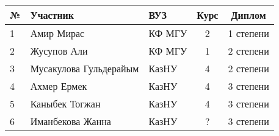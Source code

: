 \begin{center}
\begin{tabular}{|l|l|l|c|c|}
\hline
№ & Участник & ВУЗ & Курс & Диплом \\
\hline
1 & Амир Мирас & КФ МГУ & 2 & 1 степени \\
\hline
2 & Жусупов Али & КФ МГУ & 1 & 2 степени \\
\hline
3 & Мусакулова Гульдерайым & КазНУ & 4 & 2 степени \\
\hline
4 & Ахмер Ермек & КазНУ & 4 & 3 степени \\
\hline
5 & Каныбек Тогжан & КазНУ & 4 & 3 степени \\
\hline
6 & Иманбекова Жанна & КазНУ & ? & 3 степени \\
\hline
\end{tabular}
\end{center}
